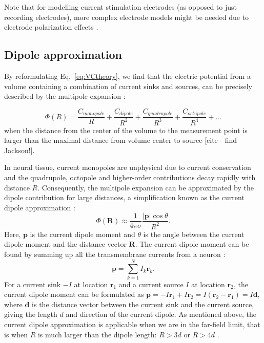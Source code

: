 Note that for modelling current stimulation electrodes (as opposed to just recording electrodes), more complex electrode models might be needed due to electrode polarization effects \citep{McIntyre2001, Martinsen2008, Joucla2012}.


\subsection{Dipole approximation}
\label{sec:dipole}

By reformulating Eq.~\eqref{eq:VCtheory}, we find that the electric potential from a volume containing a combination of current sinks and sources, can be precisely described by the multipole expansion \citep{Nunez2006}:

\begin{equation}\label{eq:multipole}
\Phi(R) = \frac{C_{monopole}}{R} + \frac{C_{dipole}}{R^2} + \frac{C_{quadrupole}}{R^3} + \frac{C_{octupole}}{R^4} + ...
\end{equation}
when the distance from the center of the volume to the measurement point is larger than the maximal distance from volume center to source [cite - find Jackson!].

In neural tissue, current monopoles are unphysical due to current conservation and the quadrupole, octopole and higher-order contributions decay rapidly with distance $R$. Consequently, the multipole expansion can be approximated by the dipole contribution for large distances, a simplification known as the current dipole approximation \citep{Nunez2006}:
\begin{equation}\label{eq:CDA}
\Phi(\mathbf{R}) \approx \frac{1}{4 \pi \sigma} \frac{|\mathbf{p}| \cos \theta}{R^2}.
\end{equation}
Here, $\mathbf{p}$ is the current dipole moment and $\theta$ is the angle between the current dipole moment and the distance vector $\mathbf{R}$. The current dipole moment can be found by summing up all the transmembrane currents from a neuron \citep{Pettersen2008, Pettersen2014, Nunez2006}: 
\begin{equation}\label{eq:dipole}
\mathbf{p} = \sum_{k=1}^N I_k \mathbf{r}_k.
\end{equation}
For a current sink $-I$ at location $\mathbf{r}_1$ and a current source $I$ at location $\mathbf{r}_2$, the current dipole moment can be formulated as $\mathbf{p} = -I\mathbf{r}_1 + I\mathbf{r}_2 = I(\mathbf{r}_2 - \mathbf{r}_1) = I\mathbf{d}$, where $\mathbf{d}$ is the distance vector between the current sink and the current source, giving the length $d$ and direction of the current dipole. As mentioned above, the current dipole approximation is applicable when we are in the far-field limit, that is when $R$ is much larger than the dipole length: $R > 3d$ or $R > 4d$ \citep{Nunez2006}.


